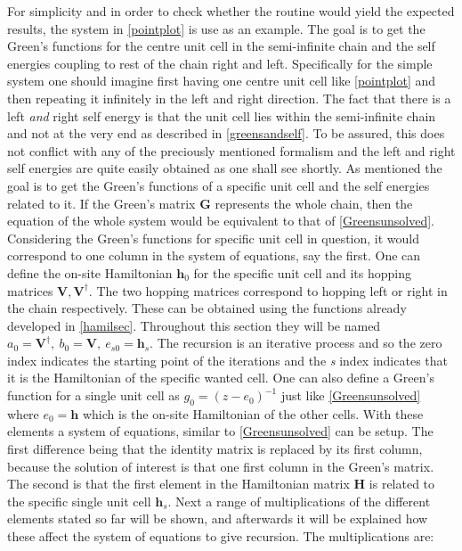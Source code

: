 For simplicity and in order to check whether the routine would yield the expected results, the system in \cref{pointplot} is use as an example. The goal is to get the Green's functions for the centre unit cell in the semi-infinite chain and the self energies coupling to rest of the chain right and left. Specifically for the simple system one should imagine first having one centre unit cell like \cref{pointplot} and then repeating it infinitely in the left and right direction. The fact that there is a left \textit{and} right self energy is that the unit cell lies within the semi-infinite chain and not at the very end as described in \cref{greensandself}. To be assured, this does not conflict with any of the preciously mentioned formalism and the left and right self energies are quite easily obtained as one shall see shortly. As mentioned the goal is to get the Green's functions of a specific unit cell and the self energies related to it. If the Green's matrix \(\mathbf{G}\) represents the whole chain, then the equation of the whole system would be equivalent to that of \cref{Greensunsolved}. Considering the Green's functions for specific unit cell in question, it would correspond to one column in the system of equations, say the first. One can define the on-site Hamiltonian \(\mathbf{h}_0\) for the specific unit cell and its hopping matrices \(\mathbf{V},\mathbf{V}^{\dagger}\).  The two hopping matrices correspond to hopping left or right in the chain respectively. These can be obtained using the functions already developed in \cref{hamilsec}. Throughout this section they will be named \(a_0 = \mathbf{V}^{\dagger}, \ b_0 = \mathbf{V}, \ e_{s0} = \mathbf{h}_{s}\). The recursion is an iterative process and so the zero index indicates the starting point of the iterations and the \textit{s} index indicates that it is the Hamiltonian of the specific wanted cell. One can also define a Green's function for a single unit cell as \(g_0 = (z-e_{0})^{-1}\) just like \cref{Greensunsolved} where \(e_{0}=\mathbf{h}\) which is the on-site Hamiltonian of the other cells. With these elements a system of equations, similar to \cref{Greensunsolved} can be setup. The first difference being that the identity matrix is replaced by its first column, because the solution of interest is that one first column in the Green's matrix. The second is that the first element in the Hamiltonian matrix \(\mathbf{H}\) is related to the specific single unit cell \(\mathbf{h}_s\). Next a range of multiplications of the different elements stated so far will be shown, and afterwards it will be explained how these affect the system of equations to give recursion. The multiplications are:
